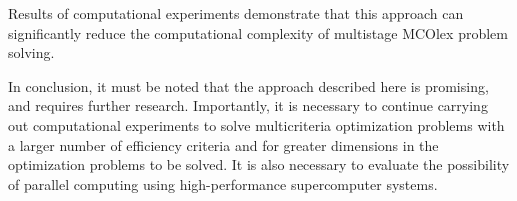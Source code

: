 \documentclass[smallextended]{svjour3}       %
\begin{document}
Results of computational experiments demonstrate that this approach can significantly reduce the computational complexity of multistage MCOlex problem solving.

In conclusion, it must be noted that the approach described here is promising, and requires further research. Importantly, it is necessary to continue carrying out computational experiments to solve multicriteria optimization problems with a larger number of efficiency criteria and for greater dimensions in the optimization problems to be solved. It is also necessary to evaluate the possibility of parallel computing using high-performance supercomputer systems.


\begin{thebibliography}{}
%
%


\end{thebibliography}
\end{document}
